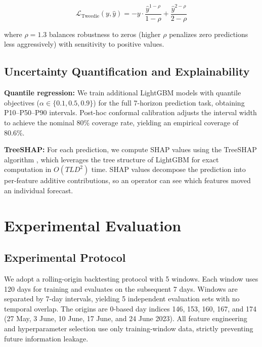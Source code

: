 \documentclass[review,authoryear]{elsarticle}
\begin{document}
\begin{equation}
    \mathcal{L}_{\text{Tweedie}}(y, \hat{y}) = -y \cdot \frac{\hat{y}^{1-\rho}}{1-\rho} + \frac{\hat{y}^{2-\rho}}{2-\rho}
    \label{eq:tweedie}
\end{equation}

where $\rho = 1.3$ balances robustness to zeros (higher $\rho$ penalizes zero predictions less aggressively) with sensitivity to positive values.

\subsection{Uncertainty Quantification and Explainability}

\textbf{Quantile regression:} We train additional LightGBM models with quantile objectives ($\alpha \in \{0.1, 0.5, 0.9\}$) for the full 7-horizon prediction task, obtaining P10--P50--P90 intervals. Post-hoc conformal calibration adjusts the interval width to achieve the nominal 80\% coverage rate, yielding an empirical coverage of 80.6\%.

\textbf{TreeSHAP:} For each prediction, we compute SHAP values using the TreeSHAP algorithm \citep{lundberg2020trees}, which leverages the tree structure of LightGBM for exact computation in $O(TLD^2)$ time. SHAP values decompose the prediction into per-feature additive contributions, so an operator can see which features moved an individual forecast.

\section{Experimental Evaluation}

\subsection{Experimental Protocol}
\label{sec:protocol}

We adopt a rolling-origin backtesting protocol with 5 windows. Each window uses 120 days for training and evaluates on the subsequent 7 days. Windows are separated by 7-day intervals, yielding 5 independent evaluation sets with no temporal overlap. The origins are 0-based day indices 146, 153, 160, 167, and 174 (27 May, 3 June, 10 June, 17 June, and 24 June 2023). All feature engineering and hyperparameter selection use only training-window data, strictly preventing future information leakage.
\end{document}
